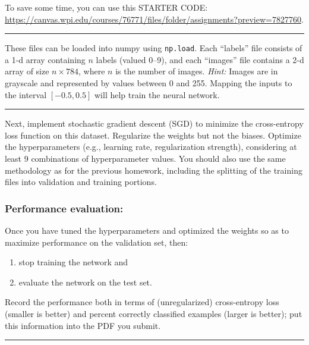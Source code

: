 \documentclass[
  letterpaper,
  DIV=11,
  numbers=noendperiod]{scrartcl}
\providecommand{\tightlist}{%
  \setlength{\itemsep}{0pt}\setlength{\parskip}{0pt}}\usepackage{longtable,booktabs,array}
\begin{document}
To save some time, you can use this STARTER CODE:
\url{https://canvas.wpi.edu/courses/76771/files/folder/assignments?preview=7827760}.

\begin{center}\rule{0.5\linewidth}{0.5pt}\end{center}

These files can be loaded into numpy using \texttt{np.load}. Each
``labels'' file consists of a 1-d array containing \(n\) labels (valued
0--9), and each ``images'' file contains a 2-d array of size
\(n \times 784\), where \(n\) is the number of images. \emph{Hint:}
Images are in grayscale and represented by values between 0 and 255.
Mapping the inputs to the interval \([-0.5, 0.5]\) will help train the
neural network.

\begin{center}\rule{0.5\linewidth}{0.5pt}\end{center}

Next, implement stochastic gradient descent (SGD) to minimize the
cross-entropy loss function on this dataset. Regularize the weights but
not the biases. Optimize the hyperparameters (e.g., learning rate,
regularization strength), considering at least 9 combinations of
hyperparameter values. You should also use the same methodology as for
the previous homework, including the splitting of the training files
into validation and training portions.

\subsubsection{Performance evaluation:}\label{performance-evaluation}

Once you have tuned the hyperparameters and optimized the weights so as
to maximize performance on the validation set, then:

\begin{enumerate}
\def\labelenumi{\arabic{enumi}.}
\tightlist
\item
  stop training the network and
\item
  evaluate the network on the test set.
\end{enumerate}

Record the performance both in terms of (unregularized) cross-entropy
loss (smaller is better) and percent correctly classified examples
(larger is better); put this information into the PDF you submit.

\begin{center}\rule{0.5\linewidth}{0.5pt}\end{center}
\end{document}
